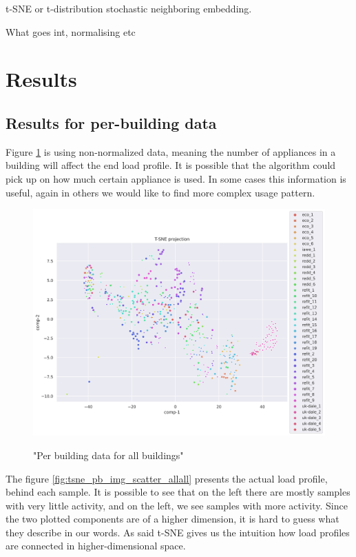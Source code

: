 t-SNE or t-distribution stochastic neighboring embedding.

What goes int, normalising etc
\section{Results}

\subsection{Results for per-building data}

Figure \ref{fig:tsne_scatter_non_norm_all} is using non-normalized data, meaning
the number of appliances in a building will affect the end load profile.
It is possible that the algorithm could pick up on how much certain appliance is used.
In some cases this information is useful, again in others we would like to find more complex usage pattern.

\begin{figure}[H]
	\centering
	\caption{"Per building data for all buildings"}
	\includegraphics[width=1.2\textwidth]{Figures/TSNE/TSNE_per_building/non_norm/scatter_non_norm_all.png}
	\label{fig:tsne_scatter_non_norm_all}
\end{figure}

The figure \ref{fig:tsne_pb_img_scatter_allall} presents the actual load profile,
behind each sample. It is possible to see that on the left there are mostly samples 
with very little activity, and on the left, we see samples with more activity.
Since the two plotted components are of a higher dimension, it is hard to 
guess what they describe in our words. 
As said t-SNE gives us the intuition how load profiles are connected in higher-dimensional space.

